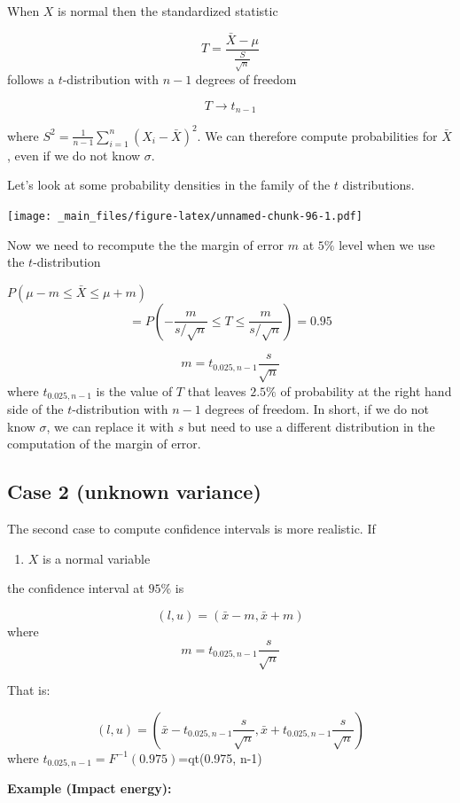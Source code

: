 \documentclass[
]{book}
\providecommand{\tightlist}{%
  \setlength{\itemsep}{0pt}\setlength{\parskip}{0pt}}
\begin{document}
When \(X\) is normal then the standardized statistic

\[T=\frac{\bar{X}-\mu}{\frac{S}{\sqrt{n}}}\]
follows a \(t\)-distribution with \(n-1\) degrees of freedom

\[T \rightarrow t_{n-1}\]

where \(S^2=\frac{1}{n-1} \sum_{i=1}^n (X_i-\bar{X})^2\). We can therefore compute probabilities for \(\bar{X}\), even if we do not know \(\sigma\).

Let's look at some probability densities in the family of the \(t\) distributions.

\texttt{[image: \_main\_files/figure-latex/unnamed-chunk-96-1.pdf]}

Now we need to recompute the the margin of error \(m\) at \(5\%\) level when we use the \(t\)-distribution

\(P(\mu-m \leq \bar{X} \leq\mu + m)\)
\[=P(-\frac{m}{s/\sqrt{n}} \leq T \leq\frac{m}{s/\sqrt{n}})=0.95\]

\[m=t_{0.025, n-1} \frac{s}{\sqrt{n}}\]
where \(t_{0.025, n-1}\) is the value of \(T\) that leaves \(2.5\%\) of probability at the right hand side of the \(t\)-distribution with \(n-1\) degrees of freedom. In short, if we do not know \(\sigma\), we can replace it with \(s\) but need to use a different distribution in the computation of the margin of error.

\hypertarget{case-2-unknown-variance}{%
\subsection{Case 2 (unknown variance)}\label{case-2-unknown-variance}}

The second case to compute confidence intervals is more realistic. If

\begin{enumerate}
\def\labelenumi{\arabic{enumi}.}
\tightlist
\item
  \(X\) is a normal variable
\end{enumerate}

the confidence interval at \(95\%\) is

\[(l,u)=(\bar{x} - m, \bar{x} + m)\]
where \[m=t_{0.025, n-1} \frac{s}{\sqrt{n}}\]

That is:

\[(l,u)=(\bar{x} - t_{0.025, n-1} \frac{s}{\sqrt{n}}, \bar{x} + t_{0.025, n-1} \frac{s}{\sqrt{n}})\]
where \(t_{0.025, n-1}=F^{-1}(0.975)\)=qt(0.975, n-1)

\textbf{Example (Impact energy):}
\end{document}
